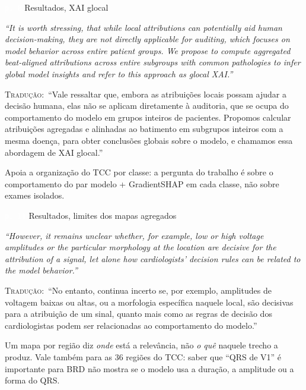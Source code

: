 \documentclass[11pt,a4paper]{article}
\newcommand{\pagechip}[1]{{\setlength{\fboxsep}{1.5pt}\colorbox{cAcc}{\textcolor{white}{\scriptsize\texttt{#1}}}}}
\newenvironment{origquote}{\par\itshape\small}{\par}
\newenvironment{tradquote}{\par\small\textsc{Tradução:}\ }{\par}
\newcommand{\explab}[1]{\par\smallskip{\small\color{cAcc}\textbf{\MakeUppercase{#1}}}\par}
\begin{document}
\begin{citacard}{\pagechip{p. 8} Resultados, XAI glocal}
\begin{origquote}“It is worth stressing, that while local attributions can potentially aid human decision-making, they are not directly applicable for auditing, which focuses on model behavior across entire patient groups. We propose to compute aggregated beat-aligned attributions across entire subgroups with common pathologies to infer global model insights and refer to this approach as glocal XAI.”\end{origquote}
\begin{tradquote}“Vale ressaltar que, embora as atribuições locais possam ajudar a decisão humana, elas não se aplicam diretamente à auditoria, que se ocupa do comportamento do modelo em grupos inteiros de pacientes. Propomos calcular atribuições agregadas e alinhadas ao batimento em subgrupos inteiros com a mesma doença, para obter conclusões globais sobre o modelo, e chamamos essa abordagem de XAI glocal.”\end{tradquote}
\explab{Explicação}
Apoia a organização do TCC por classe: a pergunta do trabalho é sobre o comportamento do par modelo + GradientSHAP em cada classe, não sobre exames isolados.
\end{citacard}

\begin{citacard}{\pagechip{p. 11} Resultados, limites dos mapas agregados}
\begin{origquote}“However, it remains unclear whether, for example, low or high voltage amplitudes or the particular morphology at the location are decisive for the attribution of a signal, let alone how cardiologists’ decision rules can be related to the model behavior.”\end{origquote}
\begin{tradquote}“No entanto, continua incerto se, por exemplo, amplitudes de voltagem baixas ou altas, ou a morfologia específica naquele local, são decisivas para a atribuição de um sinal, quanto mais como as regras de decisão dos cardiologistas podem ser relacionadas ao comportamento do modelo.”\end{tradquote}
\explab{Explicação}
Um mapa por região diz \textit{onde} está a relevância, não \textit{o quê} naquele trecho a produz. Vale também para as 36 regiões do TCC: saber que “QRS de V1” é importante para BRD não mostra se o modelo usa a duração, a amplitude ou a forma do QRS.
\end{citacard}
\end{document}
